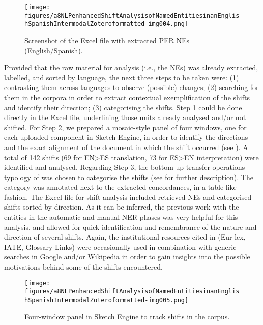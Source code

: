 \documentclass[output=paper]{langscibook}
\begin{document}
\begin{figure}
\texttt{[image: figures/a8NLPenhancedShiftAnalysisofNamedEntitiesinanEnglishSpanishIntermodalZoteroformatted-img004.png]}
 

\caption{Screenshot of the Excel file with extracted PER NEs (English/Spanish).}
\label{fig:corpas:4}
\end{figure}

Provided that the raw material for analysis (i.e., the NEs) was already extracted, labelled, and sorted by language, the next three steps to be taken were: (1) contrasting them across languages to observe (possible) changes; (2) searching for them in the corpora in order to extract contextual exemplification of the shifts and identify their direction; (3) categorising the shifts. Step 1 could be done directly in the Excel file, underlining those units already analysed and/or not shifted. For Step 2, we prepared a mosaic-style panel of four windows, one for each uploaded component in Sketch Engine, in order to identify the directions and the exact alignment of the document in which the shift occurred (see ). A total of 142 shifts (69 for EN>ES translation, 73 for ES>EN interpretation) were identified and analysed. Regarding Step 3, the bottom-up transfer operations typology of \citet{Bernardini2016} was chosen to categorise the shifts (see  for further description). The category was annotated next to the extracted concordances, in a table-like fashion. The Excel file for shift analysis included retrieved NEs and categorised shifts sorted by direction. As it can be inferred, the previous work with the entities in the automatic and manual NER phases was very helpful for this analysis, and allowed for quick identification and remembrance of the nature and direction of several shifts. Again, the institutional resources cited in  (Eur-lex, IATE, Glossary Links) were occasionally used in combination with generic searches in Google and/or Wikipedia in order to gain insights into the possible motivations behind some of the shifts encountered.

\begin{figure}  
\texttt{[image: figures/a8NLPenhancedShiftAnalysisofNamedEntitiesinanEnglishSpanishIntermodalZoteroformatted-img005.png]}
 

\caption{Four-window panel in Sketch Engine to track shifts in the corpus.}
\label{fig:corpas:5}
\end{figure}
\end{document}
